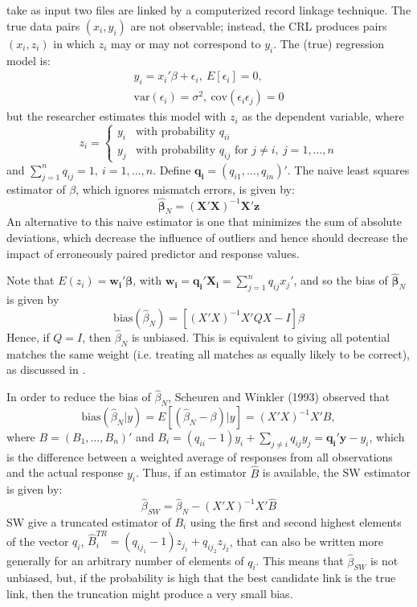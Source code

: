 \documentclass[12pt]{article}
\begin{document}
\subsection{\cite{lahiri05}}
\cite{lahiri05} take as input two files are linked by a computerized record linkage technique.  The true data pairs $(x_i, y_i)$ are not observable; instead, the CRL produces pairs $(x_i, z_i)$ in which $z_i$ may or may not correspond to $y_i$.  The (true) regression model is:
\begin{gather*}y_i = x_i'\beta + \epsilon_i,\ E[\epsilon_i] = 0,\\ \text{var}(\epsilon_i) = \sigma^2,\ \text{cov}(\epsilon_i \epsilon_j) = 0 \end{gather*}
but the researcher estimates this model with $z_i$ as the dependent variable, where $$z_i = \begin{cases} y_i & \text{with probability $q_{ii}$} \\ y_j & \text{with probability $q_{ij}$ for $j\neq i,\ j = 1,\dots,n $} \end{cases}$$ 
and $\sum_{j=1}^n q_{ij} = 1, \ i=1,\dots, n$.  Define $\mathbf{q_i} = (q_{i1}, \dots, q_{in})'$.  The naive least squares estimator of $\beta$, which ignores mismatch errors, is given by:
$$\hat{\mathbf{\beta}}_N = (\mathbf{X'X})^{-1} \mathbf{X'z} $$ 
An alternative to this naive estimator is one that minimizes the sum of absolute deviations, which decrease the influence of outliers and hence should decrease the impact of erroneously paired predictor and response values.  

Note that $E(z_i) = \mathbf{w_i'\beta}$, with $\mathbf{w_i = q_i'X_i} = \sum_{j=1}^n q_{ij} x_j' $, and so the bias of $\hat{\mathbf{\beta}}_N $ is given by
$$\text{bias}(\hat{\beta}_N) = [(X'X)^{-1} X'QX - I] \beta $$ 
Hence, if $Q = I$, then $\hat{\beta}_N$ is unbiased.  This is equivalent to giving all potential matches the same weight (i.e. treating all matches as equally likely to be correct), as discussed in \cite{ahl2019}.  

In order to reduce the bias of $\hat{\beta}_N$, Scheuren and Winkler (1993) %
observed that 
$$\text{bias} (\hat{\beta}_N | y) = E[(\hat{\beta}_N - \beta) | y ] = (X'X)^{-1} X'B,$$ 
where $B = (B_1, \dots, B_n)'$ and $B_i = (q_{ii}-1)y_i + \sum_{j\neq i } q_{ij} y_j = \mathbf{q_i'y} - y_i$, which is the difference between a weighted average of responses from all observations and the actual response $y_i$.  Thus, if an estimator $\hat{B}$ is available, the SW estimator is given by:
$$ \hat{\beta}_{SW} = \hat{\beta}_N - (X'X)^{-1} X' \hat{B}$$ 
SW give a truncated estimator of $B_i$ using the first and second highest elements of the vector $q_i$, $\hat{B}_i^{TR} = (q_{ij_1} - 1) z_{j_1} + q_{ij_2} z_{j_2}$, that can also be written more generally for an arbitrary number of elements of $q_i$.  This means that $\hat{\beta}_{SW}$ is not unbiased, but, if the probability is high that the best candidate link is the true link, then the truncation might produce a very small bias. 
\end{document}
